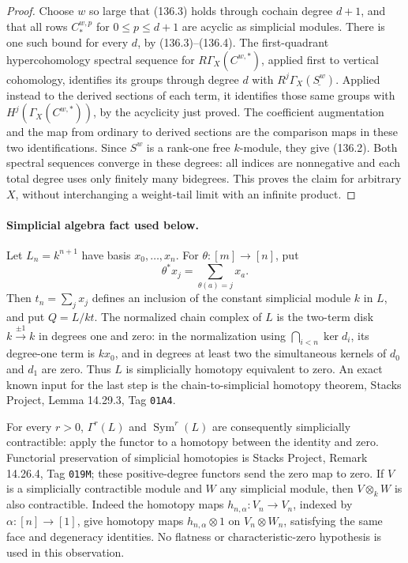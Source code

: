 \begin{proof}
Choose $w$ so large that (136.3) holds through cochain
degree $d+1$, and that all rows $C_*^{w,p}$ for
$0\leq p\leq d+1$ are acyclic as simplicial modules.
There is one such bound for every $d$, by (136.3)--(136.4).
The first-quadrant hypercohomology spectral sequence for
$R\Gamma_X(C^{w,*})$, applied first to vertical cohomology,
identifies its groups through degree $d$ with
$R^j\Gamma_X(\underline{S^w})$.
Applied instead to the derived sections of each term,
it identifies those same groups with
$H^j(\Gamma_X(C^{w,*}))$, by the acyclicity just proved.
The coefficient augmentation and the map from ordinary
to derived sections are the comparison maps in these two
identifications.  Since $S^w$ is a rank-one free
$k$-module, they give (136.2).
Both spectral sequences converge in these degrees:
all indices are nonnegative and each total degree uses
only finitely many bidegrees.  This proves the claim for
arbitrary $X$, without interchanging a weight-tail limit
with an infinite product.
\end{proof}

\paragraph{Simplicial algebra fact used below.}
Let $L_n=k^{n+1}$ have basis $x_0,\ldots,x_n$.  For
$\theta:[m]\to[n]$, put
\[
 \theta^*x_j=\sum_{\theta(a)=j}x_a.
\]
Then $t_n=\sum_jx_j$ defines an inclusion of the constant
simplicial module $k$ in $L$, and put $Q=L/kt$.
The normalized chain complex of $L$ is the two-term disk
$k\xrightarrow{\pm1}k$ in degrees one and zero: in the
normalization using $\bigcap_{i<n}\ker d_i$, its degree-one
term is $kx_0$, and in degrees at least two the simultaneous
kernels of $d_0$ and $d_1$ are zero.  Thus $L$ is simplicially
homotopy equivalent to zero.  An exact known input for the last
step is the chain-to-simplicial homotopy theorem, Stacks Project,
Lemma 14.29.3, Tag \texttt{01A4}.

For every $r>0$, $\Gamma^r(L)$ and $\operatorname{Sym}^r(L)$
are consequently simplicially contractible: apply the functor
to a homotopy between the identity and zero.  Functorial
preservation of simplicial homotopies is Stacks Project,
Remark 14.26.4, Tag \texttt{019M}; these positive-degree
functors send the zero map to zero.  If $V$ is a simplicially
contractible module and $W$ any simplicial module, then
$V\otimes_k W$ is also contractible.  Indeed the homotopy
maps $h_{n,\alpha}:V_n\to V_n$, indexed by
$\alpha:[n]\to[1]$, give homotopy maps
$h_{n,\alpha}\otimes1$ on $V_n\otimes W_n$, satisfying the
same face and degeneracy identities.  No flatness or
characteristic-zero hypothesis is used in this observation.

